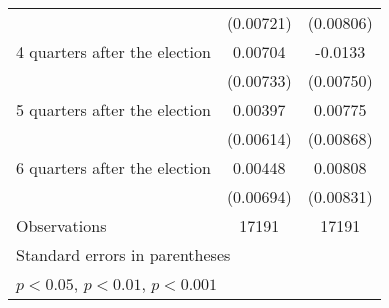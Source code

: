 \begin{table}[htbp]
\begin{tabular}{l*{2}{c}}
                    &   (0.00721)         &   (0.00806)         \\
[1em]
 4 quarters after the election&     0.00704         &     -0.0133         \\
                    &   (0.00733)         &   (0.00750)         \\
[1em]
 5 quarters after the election&     0.00397         &     0.00775         \\
                    &   (0.00614)         &   (0.00868)         \\
[1em]
 6 quarters after the election&     0.00448         &     0.00808         \\
                    &   (0.00694)         &   (0.00831)         \\
\hline
Observations        &       17191         &       17191         \\
\hline\hline
\multicolumn{3}{l}{\footnotesize Standard errors in parentheses}\\
\multicolumn{3}{l}{\footnotesize \sym{*} \(p<0.05\), \sym{**} \(p<0.01\), \sym{***} \(p<0.001\)}\\
\end{tabular}
\end{table}

